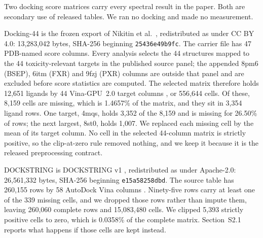 

Two docking score matrices carry every spectral result in the paper. Both are secondary use
of released tables. We ran no docking and made no measurement.

Docking-44 is the frozen export of Nikitin et al.~\cite{nikitin2025}, redistributed as
 under CC BY 4.0: 13{,}283{,}042 bytes, SHA-256
beginning \texttt{25436e49b9fc}. The carrier file has 47 PDB-named score columns. Every analysis
selects the 44 structures mapped to the 44 toxicity-relevant targets in the published source
panel; the appended 8pm6 (BSEP), 6itm (FXR) and 9fzj (PXR) columns are outside that panel and are
excluded before score statistics are computed. The selected matrix therefore holds 12{,}651
ligands by 44 Vina-GPU~2.0 target columns \cite{ding2023}, or 556{,}644 cells. Of these, 8{,}159 cells are missing, which is 1.4657\%
of the matrix, and they sit in 3{,}354 ligand rows. One target, 4mqs, holds 3{,}352 of the
8{,}159 and is missing for 26.50\% of rows; the next largest, 8st0, holds 1{,}007. We
replaced each missing cell by the mean of its target column. No cell in the selected 44-column
matrix is strictly positive, so the clip-at-zero rule removed nothing, and we keep it because it is the
released preprocessing contract.

DOCKSTRING is DOCKSTRING v1 \cite{dockstring2022}, redistributed as
 under Apache-2.0: 26{,}561{,}332 bytes, SHA-256
beginning \texttt{e15a58258dbd}. The source table has 260{,}155 rows by 58 AutoDock Vina
columns \cite{vina2010}. Ninety-five rows carry at least one of the 339 missing cells, and we
dropped those rows rather than impute them, leaving 260{,}060 complete rows and 15{,}083{,}480
cells. We clipped 5{,}393 strictly positive cells to zero, which is 0.0358\% of the complete
matrix. Section~S2.1 reports what happens if those cells are kept instead.

